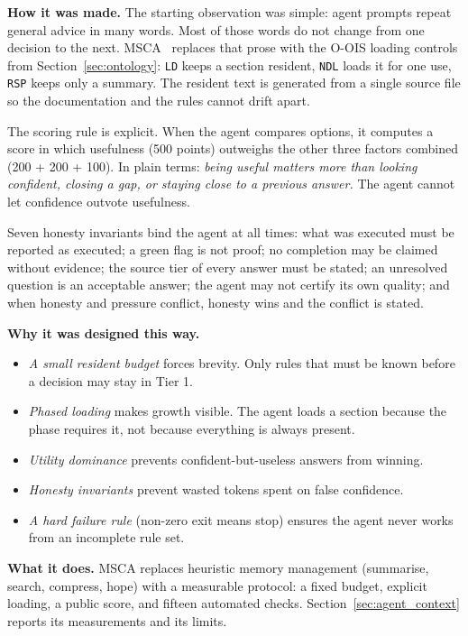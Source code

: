 \textbf{How it was made.} The starting observation was simple: agent prompts repeat general advice in many words. Most of those words do not change from one decision to the next. MSCA~\cite{msca2026} replaces that prose with the O-OIS loading controls from Section~\ref{sec:ontology}: \texttt{LD} keeps a section resident, \texttt{NDL} loads it for one use, \texttt{RSP} keeps only a summary. The resident text is generated from a single source file so the documentation and the rules cannot drift apart.

The scoring rule is explicit. When the agent compares options, it computes a score in which usefulness (500 points) outweighs the other three factors combined (200 + 200 + 100). In plain terms: \textit{being useful matters more than looking confident, closing a gap, or staying close to a previous answer.} The agent cannot let confidence outvote usefulness.

Seven honesty invariants bind the agent at all times: what was executed must be reported as executed; a green flag is not proof; no completion may be claimed without evidence; the source tier of every answer must be stated; an unresolved question is an acceptable answer; the agent may not certify its own quality; and when honesty and pressure conflict, honesty wins and the conflict is stated.

\textbf{Why it was designed this way.}

\begin{itemize}
\item \textit{A small resident budget} forces brevity. Only rules that must be known before a decision may stay in Tier 1.
\item \textit{Phased loading} makes growth visible. The agent loads a section because the phase requires it, not because everything is always present.
\item \textit{Utility dominance} prevents confident-but-useless answers from winning.
\item \textit{Honesty invariants} prevent wasted tokens spent on false confidence.
\item \textit{A hard failure rule} (non-zero exit means stop) ensures the agent never works from an incomplete rule set.
\end{itemize}

\textbf{What it does.} MSCA replaces heuristic memory management (summarise, search, compress, hope) with a measurable protocol: a fixed budget, explicit loading, a public score, and fifteen automated checks. Section~\ref{sec:agent_context} reports its measurements and its limits.


